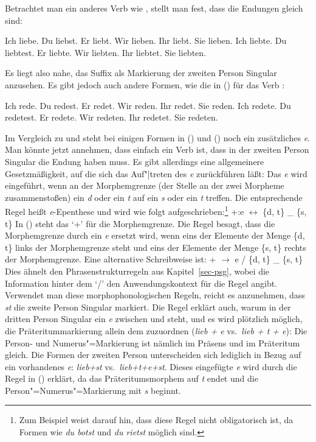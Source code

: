 \noindent
Betrachtet man ein anderes Verb wie \zb {}, stellt man fest, dass die
Endungen gleich sind:
\begin{multicols}{2}
\eal
\ex Ich liebe.
\ex Du  liebst.
\ex Er  liebt.
\ex Wir lieben.
\ex Ihr liebt.
\ex Sie lieben.
\zl
\eal
\ex Ich liebte.
\ex Du  liebtest.
\ex Er  liebte.
\ex Wir liebten.
\ex Ihr liebtet.
\ex Sie liebten.
\zl
\end{multicols}
\noindent
Es liegt also nahe, \zb das Suffix  als Markierung der zweiten Person Singular
anzusehen. Es gibt jedoch auch andere Formen, wie die in () für das Verb :
\begin{multicols}{2}
\eal
\ex Ich rede.
\ex Du  redest.
\ex Er  redet.
\ex Wir reden.
\ex Ihr redet.
\ex Sie reden.
\zl
\eal
\ex Ich redete.
\ex Du  redetest.
\ex Er  redete.
\ex Wir redeten.
\ex Ihr redetet.
\ex Sie redeten.
\zl
\end{multicols}
\noindent
Im Vergleich zu  und  steht bei einigen Formen in ()
und () noch ein zusätzliches \emph{e}. Man könnte jetzt annehmen, dass 
einfach ein Verb ist, dass in der zweiten Person Singular die Endung  haben
muss. Es gibt allerdings eine allgemeinere Gesetzmäßigkeit, auf die sich das Auf"|treten
des \emph{e} zurückführen läßt: Das \emph{e} wird eingeführt, wenn an der Morphemgrenze
(der Stelle an der zwei Morpheme zusammenstoßen) ein \emph{d} oder ein \emph{t} auf ein
\emph{s} oder ein \emph{t} treffen. Die entsprechende Regel heißt \emph{e}-Epenthese
und wird wie folgt aufgeschrieben:\footnote{
  Zum Beispiel \citet[]{Eisenberg98a} weist darauf hin, dass diese Regel nicht
  obligatorisch ist, da Formen wie \emph{du botst} und \emph{du rietst} möglich sind.%
}
\ea
\label{Regel-e-einfuegung}
+:e $\leftrightarrow$ \{d, t\} \_ \{s, t\}
\z
In () steht das `+' für die Morphemgrenze. Die Regel besagt, dass die Morphemgrenze
durch ein \emph{e} ersetzt wird, wenn eins der Elemente der Menge \{d, t\} links der Morphemgrenze
steht und eins der Elemente der Menge \{s, t\} rechts der Morphemgrenze.
Eine alternative Schreibweise ist:
\ea
+ $\to$ e / \{d, t\} \_ \{s, t\}
\z
Dies ähnelt den Phrasenstrukturregeln aus Kapitel~\ref{sec-psg}, wobei die Information hinter dem `/'
den Anwendungskontext für die Regel angibt. Verwendet man diese morphophonologischen Regeln,
reicht es anzunehmen, dass \emph{st} die zweite Person Singular markiert. Die Regel erklärt auch,
warum in der dritten Person Singular ein \emph{e} zwischen  und  steht,
und es wird plötzlich möglich, die Präteritummarkierung allein dem  zuzuordnen 
(\emph{lieb + e} vs.\ \emph{lieb + t + e}): Die Person- und
Numerus"=Markierung ist nämlich im Präsens und im Präteritum gleich. Die Formen der zweiten Person unterscheiden sich
lediglich in Bezug auf ein vorhandenes \emph{e}: \emph{lieb+st} vs.\ \emph{lieb+t+e+st}. Dieses
eingefügte \emph{e} wird durch die Regel in () erklärt, da das Präteritumsmorphem
auf \emph{t} endet und die Person"=Numerus"=Markierung mit \emph{s} beginnt.

